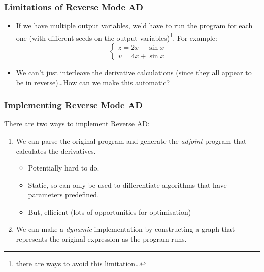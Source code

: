 \documentclass{beamer}
\begin{document}
\begin{frame}
\frametitle{Limitations of Reverse Mode AD}

\begin{itemize}
	\item If we have multiple output variables, we'd have to run the program for each one (with different seeds on the output variables)\footnote{there are ways to avoid this limitation\ldots}. For example:
\[
   \begin{cases}
     z = 2x + \sin x\\
     v = 4x + \sin x
   \end{cases}
\]
	\item We can't just interleave the derivative calculations (since they all appear to be in reverse)\ldots How can we make this automatic?
\end{itemize}
\end{frame}

\begin{frame}
\frametitle{Implementing Reverse Mode AD}

There are two ways to implement Reverse AD:

\begin{enumerate}
	\item We can parse the original program and generate the \emph{adjoint} program that calculates the derivatives.
	\begin{itemize}
		\item Potentially hard to do.
		\item Static, so can only be used to differentiate algorithms that have parameters predefined.
		\item But, efficient (lots of opportunities for optimisation)
	\end{itemize}
	\item We can make a \emph{dynamic} implementation by constructing a graph that represents the original expression as the program runs.
\end{enumerate}
\end{frame}
\end{document}

